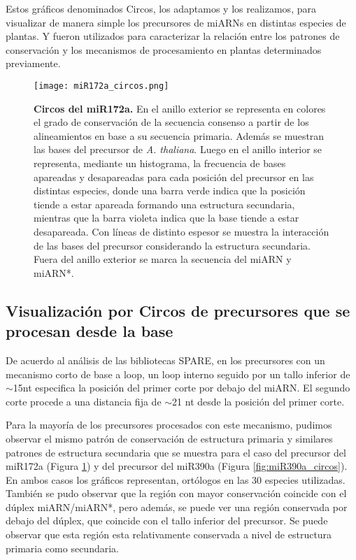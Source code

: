 Estos gráficos denominados Circos, los adaptamos y los realizamos, para visualizar de manera simple los precursores de miARNs en distintas especies de plantas.
Y fueron utilizados para caracterizar la relación entre los patrones de conservación y los mecanismos de procesamiento en plantas determinados previamente.


\begin{figure}[htbp!] 
    \centering    
    \texttt{[image: miR172a\_circos.png]}
    \caption[Circos del miR172a]{
    \textbf{Circos del miR172a.}
En el anillo exterior se representa en colores el grado de conservación de la secuencia consenso a partir de los alineamientos en base a su secuencia primaria.
Además se muestran las bases del precursor de \textit {A. thaliana}.
Luego en el anillo interior se representa, mediante un histograma, la frecuencia de bases apareadas y desapareadas para cada posición del precursor en las distintas especies, donde una barra verde indica que la posición tiende a estar apareada formando una estructura secundaria, mientras que la barra violeta indica que la base tiende a estar desapareada. 
Con líneas de distinto espesor se muestra la interacción de las bases del precursor considerando la estructura secundaria. 
Fuera del anillo exterior se marca la secuencia del miARN y miARN*.
   }
     \label{fig:miR172a_circos}
\end{figure}


\subsection{Visualización por Circos de precursores que se procesan desde la base}

De acuerdo al análisis de las bibliotecas SPARE, en los precursores con un mecanismo corto de base a loop, un loop interno seguido por un tallo inferior de $\sim$15nt especifica la posición del primer corte por debajo del miARN.
El segundo corte procede a una distancia fija de $\sim$21 nt desde la posición del primer corte.

Para la mayoría de los precursores procesados con este mecanismo, pudimos observar el mismo patrón de conservación de estructura primaria y similares patrones de estructura secundaria que se muestra para el caso del precursor del miR172a (Figura \ref{fig:miR172a_circos}) y del precursor del miR390a (Figura \ref{fig:miR390a_circos}).
En ambos casos los gráficos representan, ortólogos en las 30 especies utilizadas.
También se pudo observar que la región con mayor conservación coincide con el dúplex miARN/miARN*, pero además, se puede ver una región conservada por debajo del dúplex, que coincide con el tallo inferior del precursor.
Se puede observar que esta región esta relativamente conservada a nivel de estructura primaria como secundaria.

